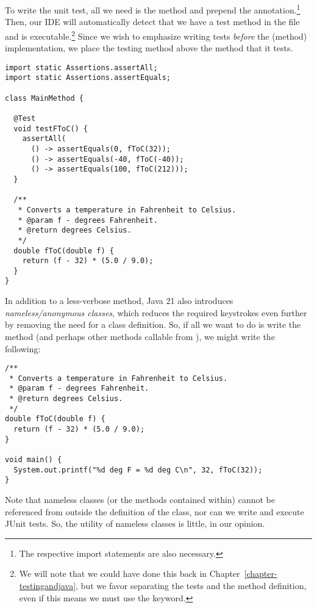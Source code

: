 To write the unit test, all we need is the  method and prepend the  annotation.\footnote{The respective import statements are also necessary.} 
Then, our IDE will automatically detect that we have a test method in the file and is executable.\footnote{We will note that we could have done this back in Chapter~\ref{chapter-testingandjava}, but we favor separating the tests and the method definition, even if this means we must use the  keyword.} 
Since we wish to emphasize writing tests \emph{before} the (method) implementation, we place the testing method above the method that it tests. 

\begin{lstlisting}[language=MyJava]
import static Assertions.assertAll;
import static Assertions.assertEquals;

class MainMethod {

  @Test
  void testFToC() {
    assertAll(
      () -> assertEquals(0, fToC(32));
      () -> assertEquals(-40, fToC(-40));
      () -> assertEquals(100, fToC(212)));
  }
  
  /**
   * Converts a temperature in Fahrenheit to Celsius.
   * @param f - degrees Fahrenheit.
   * @return degrees Celsius.
   */
  double fToC(double f) {
    return (f - 32) * (5.0 / 9.0); 
  }
}
\end{lstlisting}

In addition to a less-verbose  method, Java 21 also introduces \emph{nameless/anonymous classes}, which reduces the required keystrokes even further by removing the need for a class definition. 
So, if all we want to do is write the  method (and perhaps other methods callable from ), we might write the following:

\begin{lstlisting}[language=MyJava]
/**
 * Converts a temperature in Fahrenheit to Celsius.
 * @param f - degrees Fahrenheit.
 * @return degrees Celsius.
 */
double fToC(double f) {
  return (f - 32) * (5.0 / 9.0); 
}

void main() {
  System.out.printf("%d deg F = %d deg C\n", 32, fToC(32));
}
\end{lstlisting}

Note that nameless classes (or the methods contained within) cannot be referenced from outside the definition of the class, nor can we write and execute JUnit tests. 
So, the utility of nameless classes is little, in our opinion.


